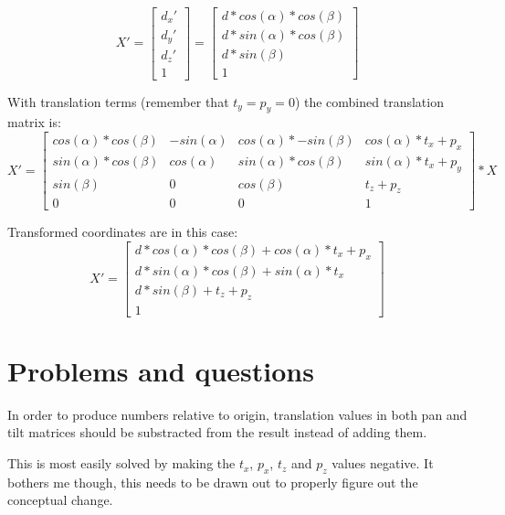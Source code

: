 \documentclass{article}
\begin{document}
\begin{equation}
X' = 
\begin{bmatrix}
d_x' \\
d_y' \\
d_z' \\
1
\end{bmatrix}
=
\begin{bmatrix}
d * cos(\alpha) * cos(\beta) \\
d * sin(\alpha) * cos(\beta) \\
d * sin(\beta) \\
1
\end{bmatrix}
\end{equation}

With translation terms (remember that $t_y = p_y = 0$) the combined translation matrix is:
\begin{equation}
X' = 
\begin{bmatrix}
cos(\alpha)*cos(\beta) & -sin(\alpha) & cos(\alpha)*-sin(\beta) & cos(\alpha)*t_x + p_x \\
sin(\alpha)*cos(\beta) & cos(\alpha) & sin(\alpha)*cos(\beta) &
sin(\alpha)*t_x + p_y \\
sin(\beta)	&	0	& cos(\beta) & t_z + p_z \\
0 & 0 & 0 & 1
\end{bmatrix}
* X
\end{equation}

Transformed coordinates are in this case:
\begin{equation}
X' = 
\begin{bmatrix}
d * cos(\alpha) * cos(\beta) + cos(\alpha)*t_x + p_x \\
d * sin(\alpha) * cos(\beta) + sin(\alpha)*t_x \\
d * sin(\beta) + t_z + p_z \\
1
\end{bmatrix}
\end{equation}

\section*{Problems and questions}
In order to produce numbers relative to origin, translation
values in both pan and tilt matrices should be substracted
from the result instead of adding them.

This is most easily solved by making the $t_x$, $p_x$, $t_z$ and
$p_z$ values negative. It bothers me though, this needs
to be drawn out to properly figure out the conceptual change.
\end{document}
